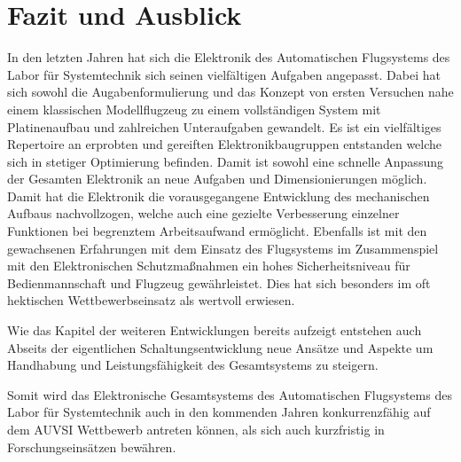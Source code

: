 \chapter{Fazit und Ausblick}\label{cha:Fazit und Ausblick}

In den letzten Jahren hat sich die Elektronik des Automatischen Flugsystems des Labor für Systemtechnik sich seinen vielfältigen Aufgaben angepasst.
Dabei hat sich sowohl die Augabenformulierung und das Konzept von ersten Versuchen nahe einem klassischen Modellflugzeug zu einem vollständigen System mit Platinenaufbau und zahlreichen Unteraufgaben gewandelt. Es ist ein vielfältiges Repertoire an erprobten und gereiften Elektronikbaugruppen entstanden welche sich in stetiger Optimierung befinden. Damit ist sowohl eine schnelle Anpassung der Gesamten Elektronik an neue Aufgaben und Dimensionierungen möglich.
Damit hat die Elektronik die vorausgegangene Entwicklung des mechanischen Aufbaus nachvollzogen, welche auch eine gezielte Verbesserung einzelner Funktionen bei begrenztem Arbeitsaufwand ermöglicht.
Ebenfalls ist mit den gewachsenen Erfahrungen mit dem Einsatz des Flugsystems im Zusammenspiel mit den Elektronischen Schutzmaßnahmen ein hohes Sicherheitsniveau für Bedienmannschaft und Flugzeug gewährleistet. Dies hat sich besonders im oft hektischen Wettbewerbseinsatz als wertvoll erwiesen.

Wie das Kapitel der weiteren Entwicklungen bereits aufzeigt entstehen auch Abseits der eigentlichen Schaltungsentwicklung neue Ansätze und Aspekte um Handhabung und Leistungsfähigkeit des Gesamtsystems zu steigern.

Somit wird das Elektronische Gesamtsystems des Automatischen Flugsystems des Labor für Systemtechnik auch in den kommenden Jahren konkurrenzfähig auf dem AUVSI Wettbewerb antreten können, als sich auch kurzfristig in Forschungseinsätzen bewähren.

